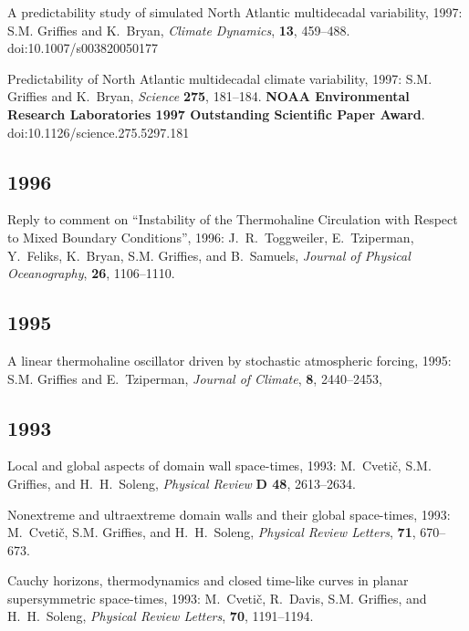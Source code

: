 \begin{etaremune}
\item A predictability study of simulated North Atlantic multidecadal variability, 1997: S.M. Grif\/f\/ies and K.\ Bryan, {\em Climate Dynamics}, {\bf 13}, 459--488. doi:10.1007/s003820050177
  
\item Predictability of North Atlantic multidecadal climate variability, 1997: S.M. Grif\/f\/ies and K.\ Bryan, {\em Science} {\bf 275}, 181--184. {\bf NOAA Environmental Research Laboratories 1997 Outstanding Scientific Paper Award}.
doi:10.1126/science.275.5297.181

\subsection*{\sc \color{Maroon} 1996}
 
\item Reply to comment on ``Instability of the Thermohaline Circulation with Respect to Mixed Boundary Conditions'', 1996: J.\ R.\ Toggweiler, E.\ Tziperman, Y.\ Feliks, K.\ Bryan, S.M. Grif\/f\/ies, and B.\ Samuels, {\em Journal of Physical
Oceanography}, {\bf 26}, 1106--1110.

\subsection*{\sc \color{Maroon} 1995}
  
\item A linear thermohaline oscillator driven by stochastic atmospheric forcing, 1995: S.M. Grif\/f\/ies and E.\ Tziperman, {\em Journal of Climate}, {\bf 8}, 2440--2453, 

\subsection*{\sc \color{Maroon} 1993}

\item Local and global aspects of domain wall space-times, 1993: M.\ Cveti\v c, S.M. Grif\/f\/ies, and H.\ H.\ Soleng, {\em Physical Review} {\bf D 48}, 2613--2634.

\item Nonextreme and ultraextreme domain walls and their global space-times, 1993: M.\ Cveti\v c, S.M. Grif\/f\/ies, and H.\ H.\ Soleng, {\em Physical Review Letters}, {\bf 71}, 670--673.

\item Cauchy horizons, thermodynamics and closed time-like curves in planar supersymmetric space-times, 1993: M.\ Cveti\v c, R.\ Davis, S.M. Grif\/f\/ies, and H.\ H.\ Soleng, {\em Physical Review Letters}, {\bf 70}, 1191--1194.



\end{etaremune}
